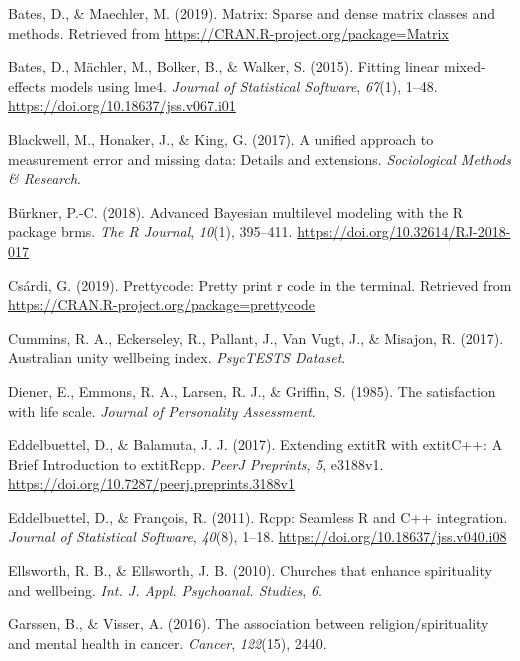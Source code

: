 \documentclass[
  english,
  man,floatsintext]{apa6}
\begin{document}
\leavevmode\hypertarget{ref-R-Matrix}{}%
Bates, D., \& Maechler, M. (2019). Matrix: Sparse and dense matrix classes and methods. Retrieved from \url{https://CRAN.R-project.org/package=Matrix}

\leavevmode\hypertarget{ref-R-lme4}{}%
Bates, D., Mächler, M., Bolker, B., \& Walker, S. (2015). Fitting linear mixed-effects models using lme4. \emph{Journal of Statistical Software}, \emph{67}(1), 1--48. \url{https://doi.org/10.18637/jss.v067.i01}

\leavevmode\hypertarget{ref-Blackwell2017-oq}{}%
Blackwell, M., Honaker, J., \& King, G. (2017). A unified approach to measurement error and missing data: Details and extensions. \emph{Sociological Methods \& Research}.

\leavevmode\hypertarget{ref-BRMSpackage}{}%
Bürkner, P.-C. (2018). Advanced Bayesian multilevel modeling with the R package brms. \emph{The R Journal}, \emph{10}(1), 395--411. \url{https://doi.org/10.32614/RJ-2018-017}

\leavevmode\hypertarget{ref-R-prettycode}{}%
Csárdi, G. (2019). Prettycode: Pretty print r code in the terminal. Retrieved from \url{https://CRAN.R-project.org/package=prettycode}

\leavevmode\hypertarget{ref-Cummins2017-ur}{}%
Cummins, R. A., Eckerseley, R., Pallant, J., Van Vugt, J., \& Misajon, R. (2017). Australian unity wellbeing index. \emph{PsycTESTS Dataset}.

\leavevmode\hypertarget{ref-Diener1985-xy}{}%
Diener, E., Emmons, R. A., Larsen, R. J., \& Griffin, S. (1985). The satisfaction with life scale. \emph{Journal of Personality Assessment}.

\leavevmode\hypertarget{ref-R-Rcpp_b}{}%
Eddelbuettel, D., \& Balamuta, J. J. (2017). Extending extitR with extitC++: A Brief Introduction to extitRcpp. \emph{PeerJ Preprints}, \emph{5}, e3188v1. \url{https://doi.org/10.7287/peerj.preprints.3188v1}

\leavevmode\hypertarget{ref-R-Rcpp_a}{}%
Eddelbuettel, D., \& François, R. (2011). Rcpp: Seamless R and C++ integration. \emph{Journal of Statistical Software}, \emph{40}(8), 1--18. \url{https://doi.org/10.18637/jss.v040.i08}

\leavevmode\hypertarget{ref-Ellsworth2010-yu}{}%
Ellsworth, R. B., \& Ellsworth, J. B. (2010). Churches that enhance spirituality and wellbeing. \emph{Int. J. Appl. Psychoanal. Studies}, \emph{6}.

\leavevmode\hypertarget{ref-Garssen2016-km}{}%
Garssen, B., \& Visser, A. (2016). The association between religion/spirituality and mental health in cancer. \emph{Cancer}, \emph{122}(15), 2440.
\end{document}
